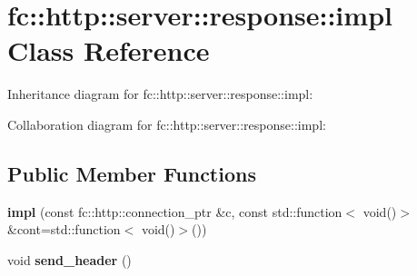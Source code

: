 \hypertarget{classfc_1_1http_1_1server_1_1response_1_1impl}{}\section{fc\+:\+:http\+:\+:server\+:\+:response\+:\+:impl Class Reference}
\label{classfc_1_1http_1_1server_1_1response_1_1impl}


Inheritance diagram for fc\+:\+:http\+:\+:server\+:\+:response\+:\+:impl\+:


Collaboration diagram for fc\+:\+:http\+:\+:server\+:\+:response\+:\+:impl\+:
\subsection*{Public Member Functions}
\begin{DoxyCompactItemize}
\item 
\mbox{\label{classfc_1_1http_1_1server_1_1response_1_1impl_af8d4e39de4b0708745a78d763e95681e}} 
{\bfseries impl} (const fc\+::http\+::connection\+\_\+ptr \&c, const std\+::function$<$ void()$>$ \&cont=std\+::function$<$ void()$>$())
\item 
\mbox{\label{classfc_1_1http_1_1server_1_1response_1_1impl_a9ffdedd0d68bf7444af43e8976846254}} 
void {\bfseries send\+\_\+header} ()
\end{DoxyCompactItemize}
